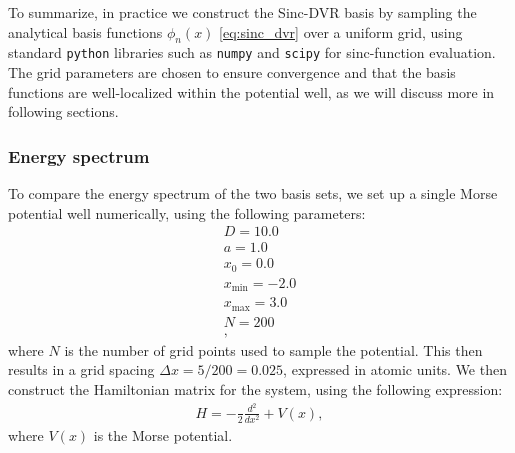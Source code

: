 \documentclass{subfiles}
\begin{document}
To summarize, in practice we construct the Sinc-DVR basis by sampling the analytical basis functions $\phi_n(x)$ \eqref{eq:sinc_dvr} over a uniform grid, using standard \texttt{python} libraries such as \texttt{numpy} and \texttt{scipy} for sinc-function evaluation. The grid parameters are chosen to ensure convergence and that the basis functions are well-localized within the potential well, as we will discuss more in following sections. 
\subsubsection*{Energy spectrum} 
To compare the energy spectrum of the two basis sets, we set up a single Morse potential well numerically, using the following parameters:
\begin{align*}
    D = 10.0 \\
    a = 1.0 \\
    x_0 = 0.0 \\
    x_{\text{min}} = -2.0 \\
    x_{\text{max}} = 3.0 \\
    N = 200 \\,
\end{align*}
where $N$ is the number of grid points used to sample the potential. This then results in a grid spacing $\Delta x = 5 / 200 = 0.025$, expressed in atomic units. We then construct the Hamiltonian matrix for the system, using the following expression:
\begin{align*}
    H = -\frac{}{2} \frac{d^2}{dx^2} + V(x),
\end{align*}
where $V(x)$ is the Morse potential. 
\end{document}
